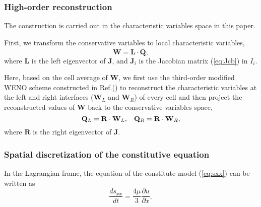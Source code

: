\documentclass[review]{elsarticle}
\begin{document}
\subsubsection{High-order reconstruction}\label{hor}
The construction is carried out in the characteristic variables  space in this paper.

First, we transform the conservative variables to local characteristic variables,
\begin{equation}\label{eq:chaVar}
  \mathbf{W} = \mathbf{L} \cdot \overline{\mathbf{Q}},
\end{equation}
where $\mathbf{L}$ is the left eigenvector of $\mathbf{J}$, and $\mathbf{J}_i$ is the Jacobian matrix  (\ref{eq:Jcb}) in $I_i$.

Here, based on the cell average of $\mathbf{W}$, we  first use the third-order modified WENO scheme constructed in Ref.(\cite{liu2018novel}) to reconstruct the characteristic variables at the  left and right interfaces ($\mathbf{W}_L$ and $\mathbf{W}_R$)  of every cell and then project the reconstructed values of $\mathbf{W}$ back to the conservative variables space,
\begin{equation}
  \mathbf{Q}_L = \mathbf{R} \cdot \mathbf{W}_L, \hspace{0.3cm}   \mathbf{Q}_R = \mathbf{R} \cdot \mathbf{W}_R,
\end{equation}
where $\mathbf{R}$ is the right eigenvector of $\mathbf{J}$.

\subsubsection{Spatial discretization of the constitutive equation}
In the Lagrangian frame, the equation of the constitute model (\ref{eq:sxx}) can be written as
\begin{equation}
  \frac{ds_{xx}}{dt} = \frac{4\mu }{3} \frac{\partial u}{\partial x},
\end{equation}
\end{document}
